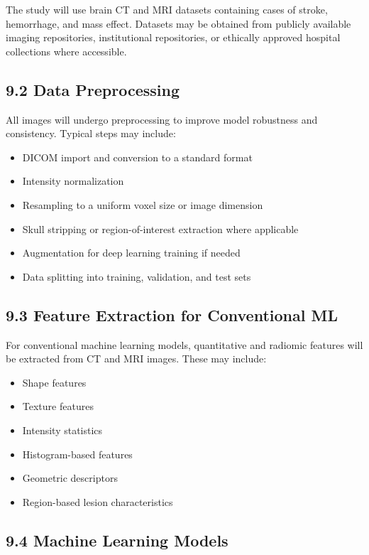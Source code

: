 \documentclass[12pt,a4paper]{report}
\begin{document}
The study will use brain CT and MRI datasets containing cases of stroke, hemorrhage, and mass effect. Datasets may be obtained from publicly available imaging repositories, institutional repositories, or ethically approved hospital collections where accessible.

\subsection{9.2 Data Preprocessing}

All images will undergo preprocessing to improve model robustness and consistency. Typical steps may include:

\begin{itemize}
\item DICOM import and conversion to a standard format
\item Intensity normalization
\item Resampling to a uniform voxel size or image dimension
\item Skull stripping or region-of-interest extraction where applicable
\item Augmentation for deep learning training if needed
\item Data splitting into training, validation, and test sets
\end{itemize}

\subsection{9.3 Feature Extraction for Conventional ML}

For conventional machine learning models, quantitative and radiomic features will be extracted from CT and MRI images. These may include:

\begin{itemize}
\item Shape features
\item Texture features
\item Intensity statistics
\item Histogram-based features
\item Geometric descriptors
\item Region-based lesion characteristics
\end{itemize}

\subsection{9.4 Machine Learning Models}
\end{document}
